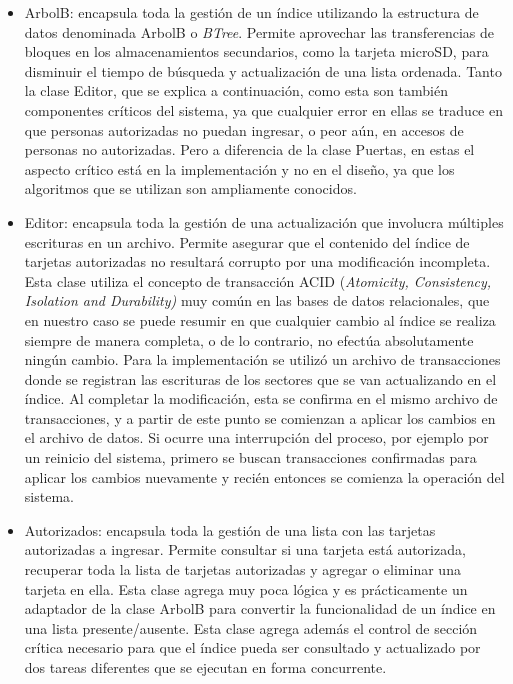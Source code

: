 \begin{itemize}
	\item ArbolB: encapsula toda la gestión de un índice utilizando la estructura de datos denominada ArbolB o \emph{BTree}\cite{noauthor_arbol-b_2019}. Permite aprovechar las transferencias de bloques en los almacenamientos secundarios, como la tarjeta microSD, para disminuir el tiempo de búsqueda y actualización de una lista ordenada. Tanto la clase Editor, que se explica a continuación, como esta son también componentes críticos del sistema, ya que cualquier error en ellas se traduce en que personas autorizadas no puedan ingresar, o peor aún, en accesos de personas no autorizadas. Pero a diferencia de la clase Puertas, en estas el aspecto crítico está en la implementación y no en el diseño, ya que los algoritmos que se utilizan son ampliamente conocidos.
		
	\item Editor: encapsula toda la gestión de una actualización que involucra múltiples escrituras en un archivo. Permite asegurar que el contenido del índice de tarjetas autorizadas no resultará corrupto por una modificación incompleta. Esta clase utiliza el concepto de transacción\cite{noauthor_transaccion_2019} ACID (\emph{Atomicity, Consistency, Isolation and Durability)}\cite{noauthor_acid_2019} muy común en las bases de datos relacionales, que en nuestro caso se puede resumir en que cualquier cambio al índice se realiza siempre de manera completa, o de lo contrario, no efectúa absolutamente ningún cambio. Para la implementación se utilizó un archivo de transacciones donde se registran las escrituras de los sectores que se van actualizando en el índice. Al completar la modificación, esta se confirma en el mismo archivo de transacciones, y a partir de este punto se comienzan a aplicar los cambios en el archivo de datos. Si ocurre una interrupción del proceso, por ejemplo por un reinicio del sistema, primero se buscan transacciones confirmadas para aplicar los cambios nuevamente y recién entonces se comienza la operación del sistema.

\FloatBarrier

	\item Autorizados: encapsula toda la gestión de una lista con las tarjetas autorizadas a ingresar. Permite consultar si una tarjeta está autorizada, recuperar toda la lista de tarjetas autorizadas y agregar o eliminar una tarjeta en ella. Esta clase agrega muy poca lógica y es prácticamente un adaptador de la clase ArbolB para convertir la funcionalidad de un índice en una lista presente/ausente. Esta clase agrega además el control de sección crítica necesario para que el índice pueda ser consultado y actualizado por dos tareas diferentes que se ejecutan en forma concurrente.


\end{itemize}
